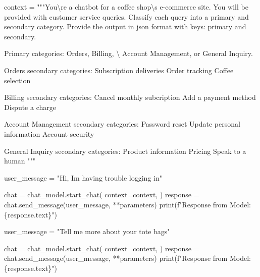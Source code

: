\documentclass[
  letterpaper,
  DIV=11,
  numbers=noendperiod]{scrreprt}
\newenvironment{Shaded}{\begin{snugshade}}{\end{snugshade}}
\newcommand{\BuiltInTok}[1]{\textcolor[rgb]{0.00,0.23,0.31}{#1}}
\newcommand{\CharTok}[1]{\textcolor[rgb]{0.13,0.47,0.30}{#1}}
\newcommand{\NormalTok}[1]{\textcolor[rgb]{0.00,0.23,0.31}{#1}}
\newcommand{\OperatorTok}[1]{\textcolor[rgb]{0.37,0.37,0.37}{#1}}
\newcommand{\SpecialCharTok}[1]{\textcolor[rgb]{0.37,0.37,0.37}{#1}}
\newcommand{\SpecialStringTok}[1]{\textcolor[rgb]{0.13,0.47,0.30}{#1}}
\newcommand{\StringTok}[1]{\textcolor[rgb]{0.13,0.47,0.30}{#1}}
\begin{document}
\begin{Shaded}
\begin{Highlighting}[]
\NormalTok{context }\OperatorTok{=} \StringTok{"""You}\CharTok{\textbackslash{}\textquotesingle{}}\StringTok{re a chatbot for a coffee shop}\CharTok{\textbackslash{}\textquotesingle{}}\StringTok{s e{-}commerce site. You will be provided with customer service queries.}
\StringTok{Classify each query into a primary and secondary category.}
\StringTok{Provide the output in json format with keys: primary and secondary.}

\StringTok{Primary categories: Orders, Billing, }\CharTok{\textbackslash{}}
\StringTok{Account Management, or General Inquiry.}

\StringTok{Orders secondary categories:}
\StringTok{Subscription deliveries}
\StringTok{Order tracking}
\StringTok{Coffee selection}

\StringTok{Billing secondary categories:}
\StringTok{Cancel monthly subcription}
\StringTok{Add a payment method}
\StringTok{Dispute a charge}

\StringTok{Account Management secondary categories:}
\StringTok{Password reset}
\StringTok{Update personal information}
\StringTok{Account security}

\StringTok{General Inquiry secondary categories:}
\StringTok{Product information}
\StringTok{Pricing}
\StringTok{Speak to a human}
\StringTok{"""}

\NormalTok{user\_message }\OperatorTok{=} \StringTok{"Hi, I\textquotesingle{}m having trouble logging in"}

\NormalTok{chat }\OperatorTok{=}\NormalTok{ chat\_model.start\_chat(}
\NormalTok{    context}\OperatorTok{=}\NormalTok{context,}
\NormalTok{)}
\NormalTok{response }\OperatorTok{=}\NormalTok{ chat.send\_message(user\_message, }\OperatorTok{**}\NormalTok{parameters)}
\BuiltInTok{print}\NormalTok{(}\SpecialStringTok{f"Response from Model: }\SpecialCharTok{\{}\NormalTok{response}\SpecialCharTok{.}\NormalTok{text}\SpecialCharTok{\}}\SpecialStringTok{"}\NormalTok{)}
\end{Highlighting}
\end{Shaded}

\begin{Shaded}
\begin{Highlighting}[]
\NormalTok{user\_message }\OperatorTok{=} \StringTok{"Tell me more about your tote bags"}

\NormalTok{chat }\OperatorTok{=}\NormalTok{ chat\_model.start\_chat(}
\NormalTok{    context}\OperatorTok{=}\NormalTok{context,}
\NormalTok{)}
\NormalTok{response }\OperatorTok{=}\NormalTok{ chat.send\_message(user\_message, }\OperatorTok{**}\NormalTok{parameters)}
\BuiltInTok{print}\NormalTok{(}\SpecialStringTok{f"Response from Model: }\SpecialCharTok{\{}\NormalTok{response}\SpecialCharTok{.}\NormalTok{text}\SpecialCharTok{\}}\SpecialStringTok{"}\NormalTok{)}
\end{Highlighting}
\end{Shaded}
\end{document}
